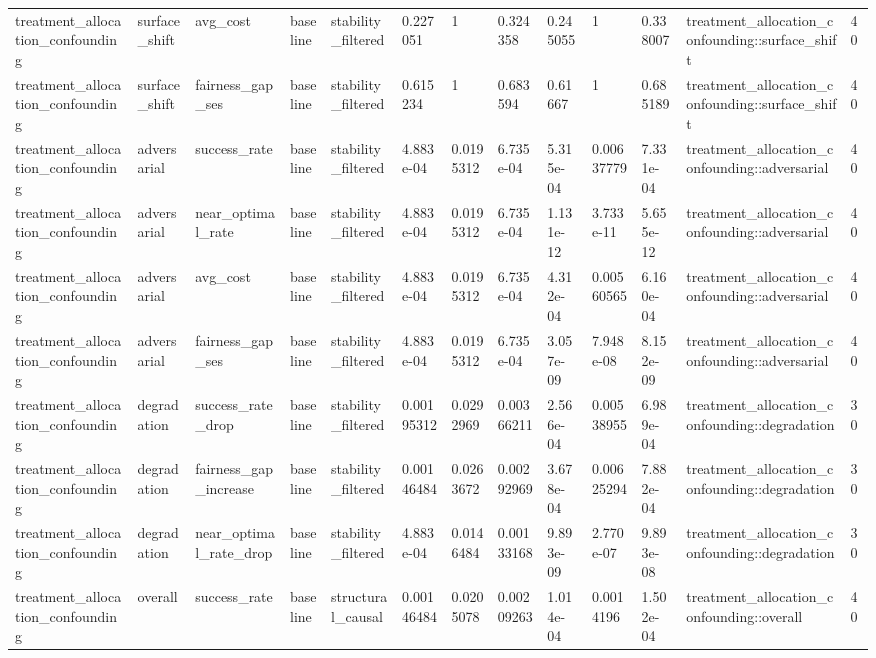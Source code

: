 \begin{tabular}{lllllllllllll}
treatment\_allocation\_confounding & surface\_shift & avg\_cost & baseline & stability\_filtered & 0.227051 & 1 & 0.324358 & 0.245055 & 1 & 0.338007 & treatment\_allocation\_confounding::surface\_shift & 40 \\
treatment\_allocation\_confounding & surface\_shift & fairness\_gap\_ses & baseline & stability\_filtered & 0.615234 & 1 & 0.683594 & 0.61667 & 1 & 0.685189 & treatment\_allocation\_confounding::surface\_shift & 40 \\
treatment\_allocation\_confounding & adversarial & success\_rate & baseline & stability\_filtered & 4.883e-04 & 0.0195312 & 6.735e-04 & 5.315e-04 & 0.00637779 & 7.331e-04 & treatment\_allocation\_confounding::adversarial & 40 \\
treatment\_allocation\_confounding & adversarial & near\_optimal\_rate & baseline & stability\_filtered & 4.883e-04 & 0.0195312 & 6.735e-04 & 1.131e-12 & 3.733e-11 & 5.655e-12 & treatment\_allocation\_confounding::adversarial & 40 \\
treatment\_allocation\_confounding & adversarial & avg\_cost & baseline & stability\_filtered & 4.883e-04 & 0.0195312 & 6.735e-04 & 4.312e-04 & 0.00560565 & 6.160e-04 & treatment\_allocation\_confounding::adversarial & 40 \\
treatment\_allocation\_confounding & adversarial & fairness\_gap\_ses & baseline & stability\_filtered & 4.883e-04 & 0.0195312 & 6.735e-04 & 3.057e-09 & 7.948e-08 & 8.152e-09 & treatment\_allocation\_confounding::adversarial & 40 \\
treatment\_allocation\_confounding & degradation & success\_rate\_drop & baseline & stability\_filtered & 0.00195312 & 0.0292969 & 0.00366211 & 2.566e-04 & 0.00538955 & 6.989e-04 & treatment\_allocation\_confounding::degradation & 30 \\
treatment\_allocation\_confounding & degradation & fairness\_gap\_increase & baseline & stability\_filtered & 0.00146484 & 0.0263672 & 0.00292969 & 3.678e-04 & 0.00625294 & 7.882e-04 & treatment\_allocation\_confounding::degradation & 30 \\
treatment\_allocation\_confounding & degradation & near\_optimal\_rate\_drop & baseline & stability\_filtered & 4.883e-04 & 0.0146484 & 0.00133168 & 9.893e-09 & 2.770e-07 & 9.893e-08 & treatment\_allocation\_confounding::degradation & 30 \\
treatment\_allocation\_confounding & overall & success\_rate & baseline & structural\_causal & 0.00146484 & 0.0205078 & 0.00209263 & 1.014e-04 & 0.0014196 & 1.502e-04 & treatment\_allocation\_confounding::overall & 40 \\

\end{tabular}
